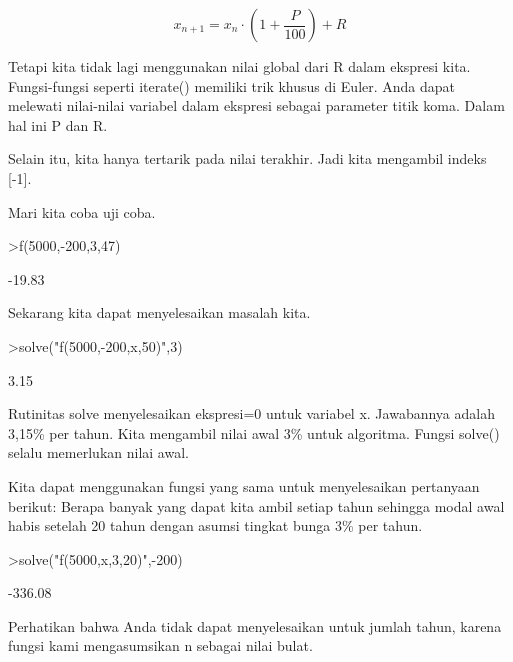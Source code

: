 \documentclass[12pt,arial,letterpaper]{book}
\begin{document}
\begin{eulercomment}
\begin{eulercomment}
\begin{eulercomment}
\begin{eulercomment}
\begin{eulercomment}
\begin{eulercomment}
\begin{eulercomment}
\begin{eulercomment}
\begin{eulercomment}
\begin{eulercomment}
\begin{eulercomment}
\begin{eulercomment}
\begin{eulercomment}
\end{eulercomment}
\begin{eulerformula}
\[
x_{n+1} = x_n \cdot \left(1+ \frac{P}{100}\right) + R
\]
\end{eulerformula}
\begin{eulercomment}
Tetapi kita tidak lagi menggunakan nilai global dari R dalam ekspresi
kita. Fungsi-fungsi seperti iterate() memiliki trik khusus di Euler.
Anda dapat melewati nilai-nilai variabel dalam ekspresi sebagai
parameter titik koma. Dalam hal ini P dan R.

Selain itu, kita hanya tertarik pada nilai terakhir. Jadi kita
mengambil indeks [-1].

Mari kita coba uji coba.
\end{eulercomment}
\begin{eulerprompt}
>f(5000,-200,3,47)
\end{eulerprompt}
\begin{euleroutput}
       -19.83 
\end{euleroutput}
\begin{eulercomment}
Sekarang kita dapat menyelesaikan masalah kita.
\end{eulercomment}
\begin{eulerprompt}
>solve("f(5000,-200,x,50)",3)
\end{eulerprompt}
\begin{euleroutput}
         3.15 
\end{euleroutput}
\begin{eulercomment}
Rutinitas solve menyelesaikan ekspresi=0 untuk variabel x. Jawabannya
adalah 3,15\% per tahun. Kita mengambil nilai awal 3\% untuk algoritma.
Fungsi solve() selalu memerlukan nilai awal.

Kita dapat menggunakan fungsi yang sama untuk menyelesaikan pertanyaan
berikut: Berapa banyak yang dapat kita ambil setiap tahun sehingga
modal awal habis setelah 20 tahun dengan asumsi tingkat bunga 3\% per
tahun.
\end{eulercomment}
\begin{eulerprompt}
>solve("f(5000,x,3,20)",-200)
\end{eulerprompt}
\begin{euleroutput}
      -336.08 
\end{euleroutput}
\begin{eulercomment}
Perhatikan bahwa Anda tidak dapat menyelesaikan untuk jumlah tahun,
karena fungsi kami mengasumsikan n sebagai nilai bulat.


\end{eulercomment}
\end{eulercomment}
\end{eulercomment}
\end{eulercomment}
\end{eulercomment}
\end{eulercomment}
\end{eulercomment}
\end{eulercomment}
\end{eulercomment}
\end{eulercomment}
\end{eulercomment}
\end{eulercomment}
\end{eulercomment}
\end{document}
